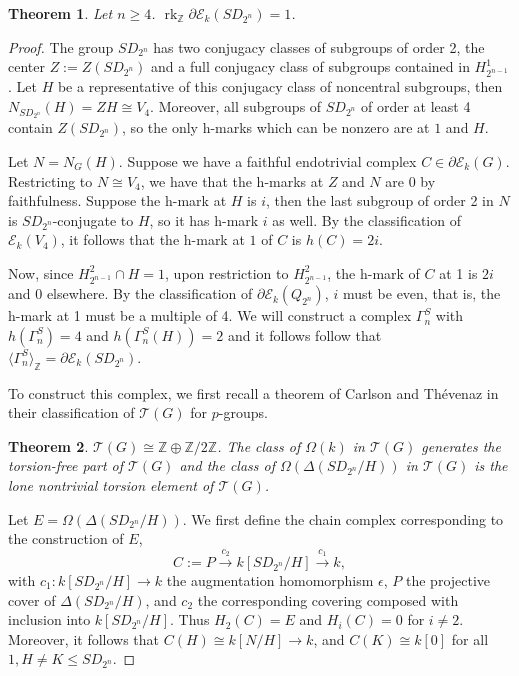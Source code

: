 \documentclass[10pt,letterpaper, boxed, cm]{amsart}
\newcommand{\Z}{\mathbb{Z}}
\newcommand{\rk}{\operatorname{rk}}
\newcommand{\calE}{\mathcal{E}}
\newcommand{\calT}{\mathcal{T}}
\newtheorem{theorem}{Theorem}[section]
\theoremstyle{remark}
\theoremstyle{definition}
\begin{document}
    \begin{theorem}
        Let $n \geq 4$. $\rk_\Z \partial\calE_{k}(SD_{2^n}) = 1$.
    \end{theorem}
    \begin{proof}
        The group $SD_{2^n}$ has two conjugacy classes of subgroups of order 2, the center $Z := Z(SD_{2^n})$ and a full conjugacy class of subgroups contained in $H_{2^{n-1}}^1$. Let $H$ be a representative of this conjugacy class of noncentral subgroups, then $N_{SD_{2^n}}(H) = ZH \cong V_4$. Moreover, all subgroups of $SD_{2^n}$ of order at least 4 contain $Z(SD_{2^n})$, so the only h-marks which can be nonzero are at $1$ and $H$.

		Let $N = N_G(H)$. Suppose we have a faithful endotrivial complex $C \in \partial\calE_k(G)$. Restricting to $N \cong V_4$, we have that the h-marks at $Z$ and $N$ are 0 by faithfulness. Suppose the h-mark at $H$ is $i$, then the last subgroup of order 2 in $N$ is $SD_{2^n}$-conjugate to $H$, so it has h-mark $i$ as well. By the classification of $\calE_k(V_4)$, it follows that the h-mark at $1$ of $C$ is $h(C) = 2i$.

		Now, since $H_{2^{n-1}}^2\cap H = 1$, upon restriction to $H_{2^{n-1}}^2$, the h-mark of $C$ at 1 is $2i$ and 0 elsewhere. By the classification of $\partial\calE_k(Q_{2^n})$, $i$ must be even, that is, the h-mark at 1 must be a multiple of 4. We will construct a complex $\Gamma_n^S$ with $h(\Gamma_n^S) = 4$ and $h(\Gamma_n^S(H)) = 2$ and it follows follow that $\langle \Gamma_n^S \rangle_\Z = \partial\calE_k(SD_{2^n})$.

		To construct this complex, we first recall a theorem of Carlson and Th\'evenaz in their classification of $\calT(G)$ for $p$-groups.
    \begin{theorem}{\cite[Theorem 7.1]{CaTh00}}
        $\calT(G) \cong \Z \oplus \Z/2\Z$. The class of $\Omega(k)$ in $\calT(G)$ generates the torsion-free part of $\calT(G)$ and the class of $\Omega(\Delta(SD_{2^n}/H))$ in $\calT(G)$ is the lone nontrivial torsion element of $\calT(G)$.
    \end{theorem}

		Let $E = \Omega(\Delta(SD_{2^n}/H))$. We first define the chain complex corresponding to the construction of $E$, \[C := P \xrightarrow{c_2} k[SD_{2^n}/H] \xrightarrow{c_1} k,\] with $c_1:k[SD_{2^n}/H] \to k$ the augmentation homomorphism $\epsilon$, $P$ the projective cover of $\Delta(SD_{2^n}/H)$, and $c_2$ the corresponding covering composed with inclusion into $k[SD_{2^n}/H]$. Thus $H_2(C) = E$ and $H_i(C) = 0$ for $i \neq 2$. Moreover, it follows that $C(H) \cong k[N/H] \to k$, and $C(K) \cong k[0]$ for all $1, H\neq K \leq SD_{2^n}$.


\end{proof}
\end{document}
